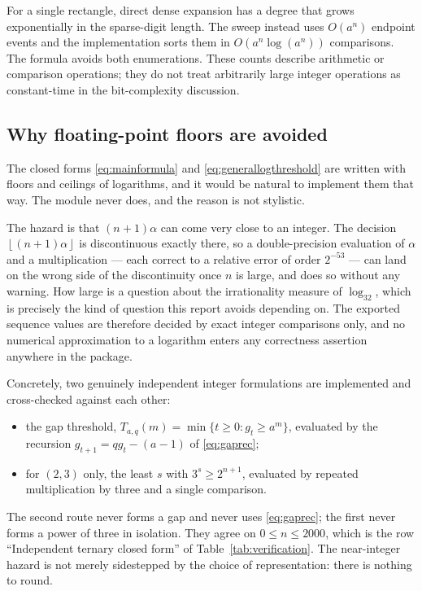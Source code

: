 \documentclass[11pt,letterpaper]{article}
\numberwithin{equation}{section}
\theoremstyle{definition}
\theoremstyle{remark}
\newcommand{\floor}[1]{\left\lfloor#1\right\rfloor}
\begin{document}
For a single rectangle, direct dense expansion has a degree that grows
exponentially in the sparse-digit length. The sweep instead uses
$O(a^n)$ endpoint events and the implementation sorts them in
$O(a^n\log(a^n))$ comparisons. The formula avoids both enumerations.
These counts describe arithmetic or comparison operations; they do not
treat arbitrarily large integer operations as constant-time in the
bit-complexity discussion.

\subsection{Why floating-point floors are avoided}\label{sec:nofloats}
The closed forms \eqref{eq:mainformula} and
\eqref{eq:generallogthreshold} are written with floors and ceilings of
logarithms, and it would be natural to implement them that way. The module
never does, and the reason is not stylistic.

The hazard is that $(n+1)\alpha$ can come very close to an integer. The
decision $\floor{(n+1)\alpha}$ is discontinuous exactly there, so a
double-precision evaluation of $\alpha$ and a multiplication --- each
correct to a relative error of order $2^{-53}$ --- can land on the wrong
side of the discontinuity once $n$ is large, and does so without any
warning. How large is a question about the irrationality measure of
$\log_32$, which is precisely the kind of question this report avoids
depending on. The exported sequence values are therefore decided by exact
integer comparisons only, and no numerical approximation to a logarithm
enters any correctness assertion anywhere in the package.

Concretely, two genuinely independent integer formulations are implemented
and cross-checked against each other:
\begin{itemize}[leftmargin=1.6em]
\item the gap threshold, $T_{a,q}(m)=\min\{t\ge0:g_t\ge a^m\}$, evaluated
      by the recursion $g_{t+1}=qg_t-(a-1)$ of \eqref{eq:gaprec};
\item for $(2,3)$ only, the least $s$ with $3^s\ge2^{n+1}$, evaluated by
      repeated multiplication by three and a single comparison.
\end{itemize}
The second route never forms a gap and never uses \eqref{eq:gaprec}; the
first never forms a power of three in isolation. They agree on
$0\le n\le2000$, which is the row ``Independent ternary closed form'' of
Table~\ref{tab:verification}. The near-integer hazard is not merely
sidestepped by the choice of representation: there is nothing to round.
\end{document}
